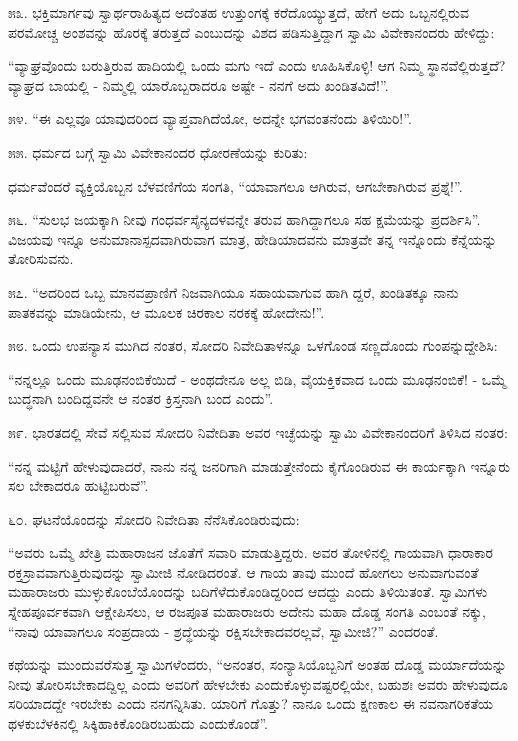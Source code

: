 ೫೩. ಭಕ್ತಿಮಾರ್ಗವು ಸ್ವಾರ್ಥರಾಹಿತ್ಯದ ಅದೆಂತಹ ಉತ್ತುಂಗಕ್ಕೆ ಕರೆದೊಯ್ಯುತ್ತದೆ, ಹೇಗೆ ಅದು ಒಬ್ಬನಲ್ಲಿರುವ ಪರಮೋಚ್ಚ ಅಂಶವನ್ನು ಹೊರಕ್ಕೆ ತರುತ್ತದೆ ಎಂಬುದನ್ನು ವಿಶದ ಪಡಿಸುತ್ತಿದ್ದಾಗ ಸ್ವಾಮಿ ವಿವೇಕಾನಂದರು ಹೇಳಿದ್ದು:

“ವ್ಯಾಘ್ರವೊಂದು ಬರುತ್ತಿರುವ ಹಾದಿಯಲ್ಲಿ ಒಂದು ಮಗು ಇದೆ ಎಂದು ಊಹಿಸಿಕೊಳ್ಳಿ! ಆಗ ನಿಮ್ಮ ಸ್ಥಾನವೆಲ್ಲಿರುತ್ತದೆ? ವ್ಯಾಘ್ರದ ಬಾಯಲ್ಲಿ - ನಿಮ್ಮಲ್ಲಿ ಯಾರೊಬ್ಬರಾದರೂ ಅಷ್ಟೇ - ನನಗೆ ಅದು ಖಂಡಿತವಿದೆ!”. 

೫೪. “ಈ ಎಲ್ಲವೂ ಯಾವುದರಿಂದ ವ್ಯಾಪ್ತವಾಗಿದೆಯೋ, ಅದನ್ನೇ ಭಗವಂತನೆಂದು ತಿಳಿಯಿರಿ!”. 

೫೫. ಧರ್ಮದ ಬಗ್ಗೆ ಸ್ವಾಮಿ ವಿವೇಕಾನಂದರ ಧೋರಣೆಯನ್ನು ಕುರಿತು:

ಧರ್ಮವೆಂದರೆ ವ್ಯಕ್ತಿಯೊಬ್ಬನ ಬೆಳವಣಿಗೆಯ ಸಂಗತಿ, “ಯಾವಾಗಲೂ ಆಗಿರುವ, ಆಗಬೇಕಾಗಿರುವ ಪ್ರಶ್ನೆ!”. 

೫೬. “ಸುಲಭ ಜಯಕ್ಕಾಗಿ ನೀವು ಗಂಧರ್ವಸೈನ್ಯದಳವನ್ನೇ ತರುವ ಹಾಗಿದ್ದಾಗಲೂ ಸಹ ಕ್ಷಮೆಯನ್ನು ಪ್ರದರ್ಶಿಸಿ”. ವಿಜಯವು ಇನ್ನೂ ಅನುಮಾನಾಸ್ಪದವಾಗಿರುವಾಗ ಮಾತ್ರ, ಹೇಡಿಯಾದವನು ಮಾತ್ರವೇ ತನ್ನ ಇನ್ನೊಂದು ಕೆನ್ನೆಯನ್ನು ತೋರಿಸುವನು. 

೫೭. “ಅದರಿಂದ ಒಬ್ಬ ಮಾನವಪ್ರಾಣಿಗೆ ನಿಜವಾಗಿಯೂ ಸಹಾಯವಾಗುವ ಹಾಗಿ ದ್ದರೆ, ಖಂಡಿತಕ್ಕೂ ನಾನು ಪಾತಕವನ್ನು ಮಾಡಿಯೇನು, ಆ ಮೂಲಕ ಚಿರಕಾಲ ನರಕಕ್ಕೆ ಹೋದೇನು!”. 

೫೮. ಒಂದು ಉಪನ್ಯಾಸ ಮುಗಿದ ನಂತರ, ಸೋದರಿ ನಿವೇದಿತಾಳನ್ನೂ ಒಳಗೊಂಡ ಸಣ್ಣದೊಂದು ಗುಂಪನ್ನುದ್ದೇಶಿಸಿ:

“ನನ್ನಲ್ಲೂ ಒಂದು ಮೂಢನಂಬಿಕೆಯಿದೆ - ಅಂಥದೇನೂ ಅಲ್ಲ ಬಿಡಿ, ವೈಯಕ್ತಿಕವಾದ ಒಂದು ಮೂಢನಂಬಿಕೆ! - ಒಮ್ಮೆ ಬುದ್ಧನಾಗಿ ಬಂದಿದ್ದವನೇ ಆ ನಂತರ ಕ್ರಿಸ್ತನಾಗಿ ಬಂದ ಎಂದು”. 

೫೯. ಭಾರತದಲ್ಲಿ ಸೇವೆ ಸಲ್ಲಿಸುವ ಸೋದರಿ ನಿವೇದಿತಾ ಅವರ ಇಚ್ಛೆಯನ್ನು ಸ್ವಾಮಿ ವಿವೇಕಾನಂದರಿಗೆ ತಿಳಿಸಿದ ನಂತರ:

“ನನ್ನ ಮಟ್ಟಿಗೆ ಹೇಳುವುದಾದರೆ, ನಾನು ನನ್ನ ಜನರಿಗಾಗಿ ಮಾಡುತ್ತೇನೆಂದು ಕೈಗೊಂಡಿರುವ ಈ ಕಾರ್ಯಕ್ಕಾಗಿ ಇನ್ನೂರು ಸಲ ಬೇಕಾದರೂ ಹುಟ್ಟಿಬರುವೆ”. 

೬೦. ಘಟನೆಯೊಂದನ್ನು ಸೋದರಿ ನಿವೇದಿತಾ ನೆನೆಸಿಕೊಂಡಿರುವುದು:

“ಅವರು ಒಮ್ಮೆ ಖೇತ್ರಿ ಮಹಾರಾಜನ ಜೊತೆಗೆ ಸವಾರಿ ಮಾಡುತ್ತಿದ್ದರು. ಅವರ ತೋಳಿನಲ್ಲಿ ಗಾಯವಾಗಿ ಧಾರಾಕಾರ ರಕ್ತಸ್ರಾವವಾಗುತ್ತಿರುವುದನ್ನು ಸ್ವಾಮೀಜಿ ನೋಡಿದರಂತೆ. ಆ ಗಾಯ ತಾವು ಮುಂದೆ ಹೋಗಲು ಅನುವಾಗುವಂತೆ ಮಹಾರಾಜರು ಮುಳ್ಳುಕೊಂಬೆಯೊಂದನ್ನು ಬದಿಗೆಳೆದುಕೊಂಡಿದ್ದರಿಂದ ಆದದ್ದು ಎಂದು ತಿಳಿಯಿತಂತೆ. ಸ್ವಾಮಿಗಳು ಸ್ನೇಹಪೂರ್ವಕವಾಗಿ ಆಕ್ಷೇಪಿಸಲು, ಆ ರಜಪೂತ ಮಹಾರಾಜರು ಅದೇನು ಮಹಾ ದೊಡ್ಡ ಸಂಗತಿ ಎಂಬಂತೆ ನಕ್ಕು, “ನಾವು ಯಾವಾಗಲೂ ಸಂಪ್ರದಾಯ - ಶ್ರದ್ಧೆಯನ್ನು ರಕ್ಷಿಸಬೇಕಾದವರಲ್ಲವೆ, ಸ್ವಾಮೀಜಿ?” ಎಂದರಂತೆ.

ಕಥೆಯನ್ನು ಮುಂದುವರೆಸುತ್ತ ಸ್ವಾಮಿಗಳೆಂದರು, “ಅನಂತರ, ಸಂನ್ಯಾಸಿಯೊಬ್ಬನಿಗೆ ಅಂತಹ ದೊಡ್ಡ ಮರ್ಯಾದೆಯನ್ನು ನೀವು ತೋರಿಸಬೇಕಾದದ್ದಿಲ್ಲ ಎಂದು ಅವರಿಗೆ ಹೇಳಬೇಕು ಎಂದುಕೊಳ್ಳುವಷ್ಟರಲ್ಲಿಯೇ, ಬಹುಶಃ ಅವರು ಹೇಳುವುದೂ ಸರಿಯಾದದ್ದೇ ಇರಬೇಕು ಎಂದು ನನಗನ್ನಿಸಿತು. ಯಾರಿಗೆ ಗೊತ್ತು? ನಾನೂ ಒಂದು ಕ್ಷಣಕಾಲ ಈ ನವನಾಗರಿಕತೆಯ ಥಳಕುಬೆಳಕಿನಲ್ಲಿ ಸಿಕ್ಕಿಹಾಕಿಕೊಂಡಿರಬಹುದು ಎಂದುಕೊಂಡೆ”.


